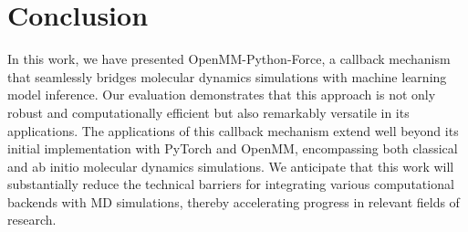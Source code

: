 \section{Conclusion}

In this work, we have presented OpenMM-Python-Force,
a callback mechanism that seamlessly bridges molecular dynamics simulations
with machine learning model inference.
Our evaluation demonstrates that this approach is not only robust and
computationally efficient but also remarkably versatile in its applications.
The applications of this callback mechanism extend well
beyond its initial implementation with PyTorch and OpenMM,
encompassing both classical and ab initio molecular dynamics simulations.
We anticipate that this work will substantially reduce the technical barriers
for integrating various computational backends with MD simulations,
thereby accelerating progress in relevant fields of research.
